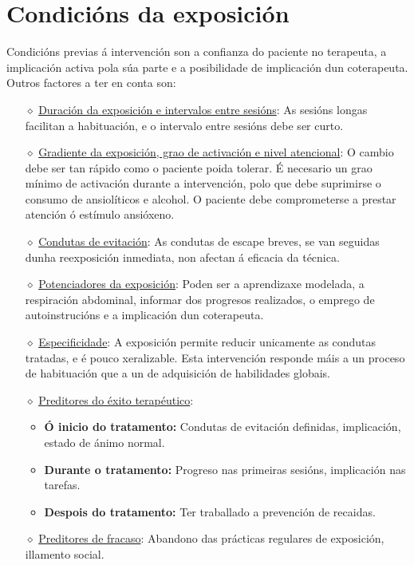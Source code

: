 \documentclass[a4paper,11pt]{article}
\begin{document}
\section{Condicións da exposición}
Condicións previas á intervención son a confianza do paciente no terapeuta, a implicación activa pola súa parte e a posibilidade de implicación dun coterapeuta. Outros factores a ter en conta son:
\begin{itemize}
	\item[$\diamond$] \underline{Duración da exposición e intervalos entre sesións}: As sesións 
	longas facilitan a habituación, e o intervalo entre sesións debe ser curto.
	\item[$\diamond$] \underline{Gradiente da exposición, grao de activación e nivel atencional}: O 
	cambio debe ser tan rápido como o paciente poida tolerar. É necesario un grao mínimo de 
	activación durante a intervención, polo que debe suprimirse o consumo de ansiolíticos e alcohol. 
	O paciente debe comprometerse a prestar atención ó estímulo ansióxeno.
	\item[$\diamond$] \underline{Condutas de evitación}: As condutas de escape breves, se van 
	seguidas dunha reexposición inmediata, non afectan á eficacia da técnica.
	\item[$\diamond$] \underline{Potenciadores da exposición}: Poden ser a aprendizaxe modelada, a 
	respiración abdominal, informar dos progresos realizados, o emprego de autoinstrucións e a 
	implicación dun coterapeuta.
	\item[$\diamond$] \underline{Especificidade}: A exposición permite reducir unicamente as condutas 
	tratadas, e é pouco xeralizable. Esta intervención responde máis a un proceso de habituación que 
	a un de adquisición de habilidades globais. 
	\item[$\diamond$] \underline{Preditores do éxito terapéutico}:
	\begin{itemize}
		\item \textbf{Ó inicio do tratamento:} Condutas de evitación definidas, implicación, estado 
		de ánimo normal.
		\item \textbf{Durante o tratamento:} Progreso nas primeiras sesións, implicación nas tarefas.
		\item \textbf{Despois do tratamento:} Ter traballado a prevención de recaidas. 
	\end{itemize}
	\item[$\diamond$] \underline{Preditores de fracaso}: Abandono das prácticas regulares de 
	exposición, illamento social.
\end{itemize}
\end{document}
